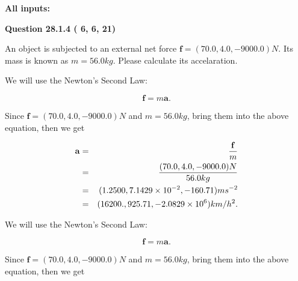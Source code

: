 \documentclass[12pt]{article}
\begin{document}
   
   
   
\noindent{}
   
   
   
   
\noindent\vspace{0.1in}\hspace{-0.08in} {\textbf{\Large{All inputs: }}}
   
   
  
\vspace{0.2in}
  
{\textbf{\Large{Question
28.1.4 
 (          6,          6,         21)
}}}
  
  
 
An object is subjected to an external net force $\mathbf{f}=(
70.0,  %
4.0,
-9000.0  )N$. Its mass is known as
$m= %
56.0 kg$. Please calculate its accelaration.
 
 
 
 
\noindent{}
 
 

We will use the Newton's Second Law:
 
\[
\mathbf{f}=m\mathbf{a}.
\]
 
Since $\mathbf{f}=( %
70.0,  %
4.0,  %
-9000.0 )N$
and $m= %
56.0 kg$, bring them into the above equation, then we get
 
\begin{eqnarray*}
\mathbf{a}&=&\frac{\mathbf{f}}m  \\
&=&\frac{(
70.0 ,
4.0 ,
-9000.0 )N
}{ %
56.0 kg}  \\
&=&(
1.2500 ,
7.1429 \times 10^{-2},
-160.71
)ms^{-2} \\
&=&(
16200. ,
925.71 ,
-2.0829 \times 10^{6}
)km/h^2.
\end{eqnarray*}
 
 
 
\noindent{}
 
 

 
 
 
\noindent{}
 
 

We will use the Newton's Second Law:
 
\[
\mathbf{f}=m\mathbf{a}.
\]
 
Since $\mathbf{f}=( %
70.0,  %
4.0,  %
-9000.0 )N$
and $m= %
56.0 kg$, bring them into the above equation, then we get
 
\end{document}
